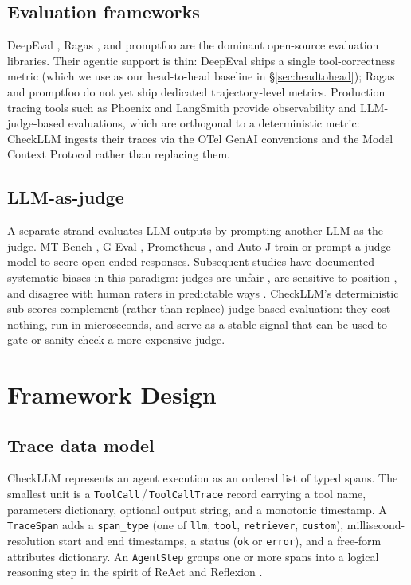 \documentclass{article}
\begin{document}
\subsection{Evaluation frameworks}
DeepEval \citep{confidentai2024deepeval}, Ragas \citep{es2024ragas},
and promptfoo \citep{promptfoo2024} are the dominant open-source
evaluation libraries. Their agentic support is thin: DeepEval ships a
single tool-correctness metric (which we use as our head-to-head
baseline in \S\ref{sec:headtohead}); Ragas and promptfoo do not yet
ship dedicated trajectory-level metrics. Production tracing tools
such as Phoenix \citep{arize2024phoenix} and LangSmith
\citep{langchain2025langsmithevals} provide observability and
LLM-judge-based evaluations, which are orthogonal to a deterministic
metric: CheckLLM ingests their traces via the OTel GenAI conventions
\citep{otelgenai2024} and the Model Context Protocol
\citep{anthropic2024mcp} rather than replacing them.

\subsection{LLM-as-judge}
A separate strand evaluates LLM outputs by prompting another LLM as
the judge. MT-Bench \citep{zheng2023mtbench}, G-Eval
\citep{liu2023geval}, Prometheus \citep{kim2024prometheus,
kim2024prometheus2}, and Auto-J \citep{li2024autoj} train or prompt a
judge model to score open-ended responses. Subsequent studies have
documented systematic biases in this paradigm: judges are unfair
\citep{wang2024notfair}, are sensitive to position
\citep{shi2025positionbias}, and disagree with human raters in
predictable ways \citep{chen2024judgebias}. CheckLLM's deterministic
sub-scores complement (rather than replace) judge-based evaluation:
they cost nothing, run in microseconds, and serve as a stable signal
that can be used to gate or sanity-check a more expensive judge.

\section{Framework Design}
\label{sec:framework}

\subsection{Trace data model}
\label{subsec:datamodel}
CheckLLM represents an agent execution as an ordered list of typed
spans. The smallest unit is a \texttt{ToolCall}\,/\,\texttt{ToolCallTrace}
record carrying a tool name, parameters dictionary, optional output
string, and a monotonic timestamp. A \texttt{TraceSpan} adds a
\texttt{span\_type} (one of \texttt{llm}, \texttt{tool},
\texttt{retriever}, \texttt{custom}), millisecond-resolution start and
end timestamps, a status (\texttt{ok} or \texttt{error}), and a
free-form attributes dictionary. An \texttt{AgentStep} groups one or
more spans into a logical reasoning step in the spirit of ReAct
\citep{yao2023react} and Reflexion \citep{shinn2023reflexion}.
\end{document}
